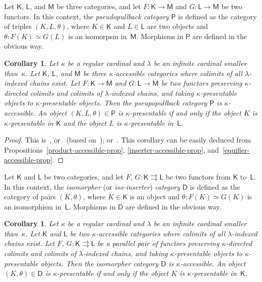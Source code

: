 \documentclass[12pt,a4paper]{amsart}
\newcommand{\+}{\protect\nobreakdash-}
\renewcommand{\:}{\colon}
\newcommand{\rarrow}{\longrightarrow}
\newcommand{\sD}{\mathsf D}
\newcommand{\sK}{\mathsf K}
\newcommand{\sL}{\mathsf L}
\newcommand{\sM}{\mathsf M}
\newcommand{\sP}{\mathsf P}
\theoremstyle{plain}
\newtheorem{cor}[thm]{Corollary}
\theoremstyle{definition}
\begin{document}
 Let $\sK$, $\sL$, and $\sM$ be three categories, and let
$F\:\sK\rarrow\sM$ and $G\:\sL\rarrow\sM$ be two functors.
 In this context, the \emph{pseudopullback category} $\sP$ is
defined as the category of triples $(K,L,\theta)$, where $K\in\sK$
and $L\in\sL$ are two objects and $\theta\:F(K)\simeq G(L)$ is
an isomorpsm in\/~$\sM$.
 Morphisms in $\sP$ are defined in the obvious way.

\begin{cor} \label{pseudopullback-accessible-cor}
 Let\/ $\kappa$ be a regular cardinal and\/ $\lambda$ be an infinite
cardinal smaller than\/~$\kappa$.
 Let\/ $\sK$, $\sL$, and\/ $\sM$ be three\/ $\kappa$\+accessible
categories where colimits of all\/ $\lambda$\+indexed chains exist.
 Let $F\:\sK\rarrow\sM$ and $G\:\sL\rarrow\sM$ be two functors
preserving\/ $\kappa$\+directed colimits and colimits of
$\lambda$\+indexed chains, and taking\/ $\kappa$\+presentable objects
to\/ $\kappa$\+presentable objects.
 Then the pseupopullback category\/ $\sP$ is\/ $\kappa$\+accessible.
 An object $(K,L,\theta)\in\sP$ is\/ $\kappa$\+presentable if and only
if the object $K$ is\/ $\kappa$\+presentable in\/ $\sK$ and
the object $L$ is\/ $\kappa$\+presentable in\/~$\sL$.
\end{cor}

\begin{proof}
 This is~\cite[Remark~3.2(I), Theorem~3.8, Corollary~3.9, and
Remark~3.11(II)]{Ulm}, or~\cite[Pseudopullback Theorem~2.2]{RR}
(based on~\cite[Proposition~3.1]{CR}), or~\cite[Corollary~5.1]{Pacc}.
 This corollary can be easily deduced from
Propositions~\ref{product-accessible-prop},
\ref{inserter-accessible-prop}, and~\ref{equifier-accessible-prop}.
\end{proof}

 Let $\sK$ and $\sL$ be two categories, and let $F$, $G\:\sK
\rightrightarrows\sL$ be two functors from $\sK$ to~$\sL$.
 In this context, the \emph{isomorpher} (or \emph{iso-inserter})
\emph{category} $\sD$ is defined as the category of pairs $(K,\theta)$,
where $K\in\sK$ is an object and $\theta\:F(K)\simeq G(K)$ is
an isomorphism in~$\sL$.
 Morphisms in $\sD$ are defined in the obvious way.

\begin{cor} \label{isomorpher-accessible-cor}
 Let\/ $\kappa$ be a regular cardinal and\/ $\lambda$ be an infinite
cardinal smaller than\/~$\kappa$.
 Let\/ $\sK$ and\/ $\sL$ be two\/ $\kappa$\+accessible categories
where colimits of all\/ $\lambda$\+indexed chains exist.
  Let $F$, $G\:\sK\rightrightarrows\sL$ be a parallel pair of functors
preserving\/ $\kappa$\+directed colimits and colimits of
$\lambda$\+indexed chains, and taking\/ $\kappa$\+presentable objects
to\/ $\kappa$\+presentable objects.
 Then the isomorpher category\/ $\sD$ is\/ $\kappa$\+accessible.
 An object $(K,\theta)\in\sD$ is\/ $\kappa$\+presentable if and only
if the object $K$ is\/ $\kappa$\+presentable in\/~$\sK$.
\end{cor}
\end{document}
